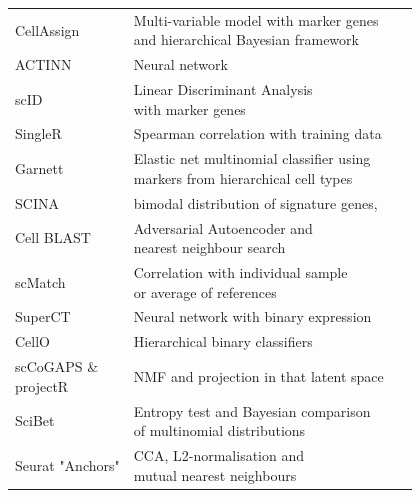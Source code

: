 \begin{table}[p]
\begin{tabular}{l|l|c}
CellAssign & \specialcell[t]{Multi-variable model with marker genes 
\\and hierarchical Bayesian framework} & ~\citep{zhang_probabilistic_2019}\\

ACTINN & Neural network & ~\citep{ma_automated_2019}\\

scID & \specialcell[t]{Linear Discriminant Analysis\\with marker genes} & ~\citep{boufea_scid:_2019}\\

SingleR & Spearman correlation with training data & ~\citep{aran_reference-based_2019}\\

Garnett & \specialcell[t]{Elastic net multinomial classifier using\\markers from hierarchical cell types} & ~\citep{pliner_supervised_2019}\\

SCINA & bimodal distribution of signature genes, & ~\citep{zhang_scina:_2019}\\

Cell BLAST & \specialcell[t]{Adversarial Autoencoder and\\nearest neighbour search} & ~\citep{cao_cell_2019}\\

scMatch & \specialcell[t]{Correlation with individual sample\\or average of references} & ~\citep{hou_scmatch:_2019}\\

SuperCT & Neural network with binary expression & ~\citep{xie_superct:_2019}\\

CellO & Hierarchical binary classifiers & ~\citep{bernstein_hierarchical_2019}\\

\specialcell[t]{scCoGAPS \&\\projectR} & NMF and projection in that latent space & ~\citep{stein-obrien_decomposing_2019}\\

SciBet & \specialcell[t]{Entropy test and Bayesian comparison\\of multinomial distributions} & ~\citep{li_scibet:_2019}\\

Seurat "Anchors" & \specialcell[t]{CCA, L2-normalisation and\\mutual nearest neighbours} & ~\citep{stuart_comprehensive_2019}\\


\end{tabular}
\end{table}
